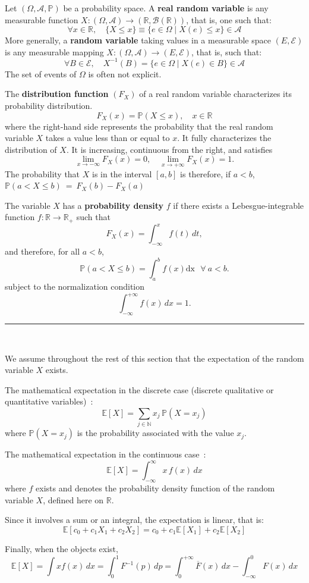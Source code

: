 \begin{f}
	
	Let \( (\Omega, \mathcal{A}, \mathbb{P})\) be a probability space. 
	A \textbf{real random variable} is any measurable function 
	\(X: (\Omega, \mathcal{A}) \to (\mathbb{R}, \mathcal{B}(\mathbb{R}))\), 
	that is, one such that:
	\[
	\forall x \in \mathbb{R}, \quad \lbrace X \leq x \rbrace \equiv 
	\lbrace e \in \Omega \mid X(e) \leq x \rbrace \in \mathcal{A}
	\]
	More generally, a \textbf{random variable} taking values in 
	a measurable space \((E, \mathcal{E})\) is any measurable mapping 
	\(X: (\Omega, \mathcal{A}) \to (E, \mathcal{E})\), that is, such that:
	\[
	\forall B \in \mathcal{E}, \quad X^{-1}(B) = 
	\lbrace e \in \Omega \mid X(e) \in B \rbrace \in \mathcal{A}
	\]
	The set of events of \(\Omega\) is often not explicit.
	
	The \textbf{distribution function} \((F_X)\) of a real random variable characterizes its probability distribution.
	\[
	F_X(x)=\mathbb {P}(X\leq x), \quad  x\in \mathbb{R}
	\]
	where the right-hand side represents the probability that the real random variable \(X\) takes a value less than or equal to \(x\).
	It fully characterizes the distribution of \(X\). It is increasing, continuous from the right, and satisfies
	\[
	\lim_{x\to -\infty} F_X(x)=0, \quad \lim_{x\to +\infty} F_X(x)=1.
	\]
	The probability that \(X\) is in the interval \([a, b]\) is therefore, if \(a< b\),
	\(
	\mathbb{P}(a< X\leq b)\ =\ F_X(b)-F_X(a)
	\)
	
	The variable \(X\) has a  \textbf{probability density} \(f\) if there exists a Lebesgue-integrable function \(f: \mathbb{R} \to \mathbb{R}_+\) such that
	\[
	F_X(x)=\int_{-\infty}^x f(t)\,dt,
	\]
	and therefore, for all \(a<b\),    
	\[
	\mathbb{P}(a< X\leq b)=\int_a^b f(x) \mathrm{dx} \mbox{ \  }\forall\ a<b.
	\]
	subject to the normalization condition
	\[
	\int_{-\infty}^{+\infty} f(x)\,dx = 1.
	\]
\end{f}
\hrule
\begin{f}[Expectations]{\ }
	
	We assume throughout the rest of this section that the expectation of the random variable \(X\) exists.
	
	The mathematical expectation in the discrete case (discrete qualitative or quantitative variables)~:
	\[
	\mathbb{E}[X]=\sum_{j\in \mathbb{N}} x_j\,\mathbb{P}(X=x_j)
	\]
	where \(\mathbb{P}(X=x_j)\) is the probability associated with the value \(x_j\).
	
	The mathematical expectation in the continuous case~:
	\[
	\mathbb{E}[X]=\int_{-\infty}^{\infty} x\, f(x)\,dx
	\]
	where \(f\) exists and denotes the probability density function of the random variable \(X\), defined here on \(\mathbb{R}\).
	
	Since it involves a sum or an integral, the expectation is linear, that is:
	\[
	\mathbb{E}\left[c_0+c_1X_1+c_2X_2\right]=c_0+c_1\mathbb{E}[X_1]+c_2\mathbb{E}[X_2]
	\]
	
	Finally, when the objects exist,
	\[
	\mathbb{E}[X]=\int x f(x)\,dx
	= \int_0^1 F^{-1}(p)\,dp
	= \int_{0}^{+\infty} \overline{F}(x)\,dx -\int_{-\infty}^{0}  F(x)\,dx
	\]
\end{f}
